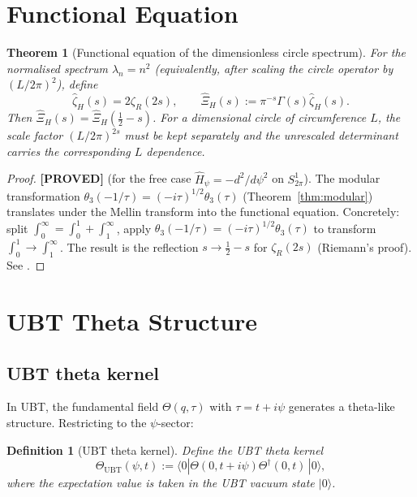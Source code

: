 \documentclass[11pt,a4paper]{article}
\newtheorem{theorem}{Theorem}
\newtheorem{definition}{Definition}
\newcommand{\proved}[1]{\textbf{[PROVED]} #1}
\begin{document}
\section{Functional Equation}

\begin{theorem}[Functional equation of the dimensionless circle spectrum]
  \label{thm:funceq}
  For the normalised spectrum $\lambda_n=n^2$ (equivalently, after scaling the circle operator by $(L/2\pi)^2$), define
  \[
    \widehat\zeta_H(s)=2\zeta_R(2s),\qquad
    \widehat\Xi_H(s):=\pi^{-s}\Gamma(s)\widehat\zeta_H(s).
  \]
  Then $\widehat\Xi_H(s)=\widehat\Xi_H(\tfrac12-s)$.  For a dimensional circle of circumference $L$, the scale factor $(L/2\pi)^{2s}$ must be kept separately and the unrescaled determinant carries the corresponding $L$ dependence.
\end{theorem}

\begin{proof}
  \proved{} (for the free case $\hat{H}_\psi = -d^2/d\psi^2$ on $S^1_{2\pi}$).
  The modular transformation $\theta_3(-1/\tau) = (-i\tau)^{1/2}\theta_3(\tau)$
  (Theorem~\ref{thm:modular}) translates under the Mellin transform into the
  functional equation.  Concretely: split $\int_0^\infty = \int_0^1 + \int_1^\infty$,
  apply $\theta_3(-1/\tau) = (-i\tau)^{1/2}\theta_3(\tau)$ to transform
  $\int_0^1 \to \int_1^\infty$.  The result is the reflection $s \to \frac12 - s$
  for $\zeta_R(2s)$ (Riemann's proof).  See \cite[Ch.\ 2]{Davenport}.
\end{proof}

\section{UBT Theta Structure}

\subsection{UBT theta kernel}

In UBT, the fundamental field $\Theta(q,\tau)$ with $\tau = t + i\psi$ generates
a theta-like structure.  Restricting to the $\psi$-sector:

\begin{definition}[UBT theta kernel]
  \label{def:ubttheta}
  Define the UBT theta kernel
  \[
    \Theta_\mathrm{UBT}(\psi, t) := \langle 0|\Theta(0, t+i\psi)\Theta^\dagger(0,t)\,|0\rangle,
  \]
  where the expectation value is taken in the UBT vacuum state $|0\rangle$.
\end{definition}
\end{document}
